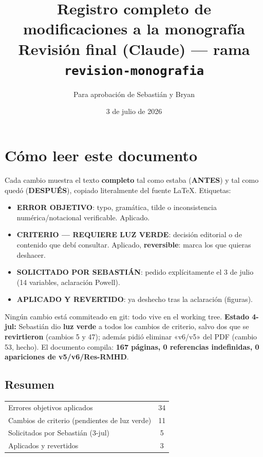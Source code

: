 \documentclass[11pt,a4paper]{article}
\title{\textbf{Registro completo de modificaciones a la monografía}\\[2pt]
\large Revisión final (Claude) --- rama \texttt{revision-monografia}}
\author{Para aprobación de Sebastián y Bryan}
\date{3 de julio de 2026}
\begin{document}
\maketitle

\section*{Cómo leer este documento}
Cada cambio muestra el texto \textbf{completo} tal como estaba (\textcolor{antesline}{\textbf{ANTES}}) y tal como quedó (\textcolor{despline}{\textbf{DESPUÉS}}), copiado literalmente del fuente \LaTeX. Etiquetas:
\begin{itemize}
\item \colorbox{okbg}{\textbf{\footnotesize ERROR OBJETIVO}}: typo, gramática, tilde o inconsistencia numérica/notacional verificable. Aplicado.
\item \colorbox{critbg}{\textbf{\footnotesize CRITERIO --- REQUIERE LUZ VERDE}}: decisión editorial o de contenido que debí consultar. Aplicado, \textbf{reversible}: marca los que quieras deshacer.
\item \colorbox{usrbg}{\textbf{\footnotesize SOLICITADO POR SEBASTIÁN}}: pedido explícitamente el 3 de julio (14 variables, aclaración Powell).
\item \colorbox{revbg}{\textbf{\footnotesize APLICADO Y REVERTIDO}}: ya deshecho tras la aclaración (figuras).
\end{itemize}
Ningún cambio está commiteado en git: todo vive en el working tree. \textbf{Estado 4-jul:} Sebastián dio \textbf{luz verde} a todos los cambios de criterio, salvo dos que se \textbf{revirtieron} (cambios 5 y 47); además pidió eliminar «v6/v5» del PDF (cambio 53, hecho). El documento compila: \textbf{167 páginas, 0 referencias indefinidas, 0 apariciones de v5/v6/Res-RMHD}.

\vspace{4pt}
\subsection*{Resumen}
\begin{tabular}{lc}
\toprule
Errores objetivos aplicados & 34 \\
Cambios de criterio (pendientes de luz verde) & 11 \\
Solicitados por Sebastián (3-jul) & 5 \\
Aplicados y revertidos & 3 \\
\bottomrule
\end{tabular}
\end{document}
